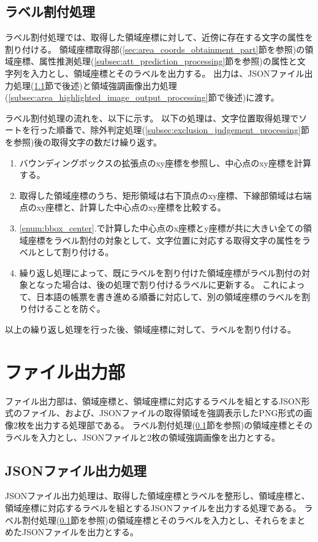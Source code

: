 \subsection{ラベル割付処理}\label{subsec:label_link_processing}
ラベル割付処理では、取得した領域座標に対して、近傍に存在する文字の属性を割り付ける。
領域座標取得部(\ref{sec:area_coords_obtainment_part}節を参照)の領域座標、属性推測処理(\ref{subsec:att_prediction_processing}節を参照)の属性と文字列を入力とし、領域座標とそのラベルを出力する。
出力は、JSONファイル出力処理(\ref{subsec:json_file_output_processing}節で後述)と領域強調画像出力処理(\ref{subsec:area_highlighted_image_output_processing}節で後述)に渡す。

ラベル割付処理の流れを、以下に示す。
以下の処理は、文字位置取得処理でソートを行った順番で、除外判定処理(\ref{subsec:exclusion_judgement_processing}節を参照)後の取得文字の数だけ繰り返す。

\begin{enumerate}
    \item \label{enum:bbox_center} バウンディングボックスの拡張点のxy座標を参照し、中心点のxy座標を計算する。
    \item 取得した領域座標のうち、矩形領域は右下頂点のxy座標、下線部領域は右端点のxy座標と、計算した中心点のxy座標を比較する。
    \item \ref{enum:bbox_center}.で計算した中心点のx座標とy座標が共に大きい全ての領域座標をラベル割付の対象として、文字位置に対応する取得文字の属性をラベルとして割り付ける。
    \item 繰り返し処理によって、既にラベルを割り付けた領域座標がラベル割付の対象となった場合は、後の処理で割り付けるラベルに更新する。
          これによって、日本語の帳票を書き進める順番に対応して、別の領域座標のラベルを割り付けることを防ぐ。
\end{enumerate}

以上の繰り返し処理を行った後、領域座標に対して、ラベルを割り付ける。

\section{ファイル出力部}\label{subsec:file_output_part}
ファイル出力部は、領域座標と、領域座標に対応するラベルを組とするJSON形式のファイル、および、JSONファイルの取得領域を強調表示したPNG形式の画像2枚を出力する処理部である。
ラベル割付処理(\ref{subsec:label_link_processing}節を参照)の領域座標とそのラベルを入力とし、JSONファイルと2枚の領域強調画像を出力とする。

\subsection{JSONファイル出力処理}\label{subsec:json_file_output_processing}
JSONファイル出力処理は、取得した領域座標とラベルを整形し、領域座標と、領域座標に対応するラベルを組とするJSONファイルを出力する処理である。
ラベル割付処理(\ref{subsec:label_link_processing}節を参照)の領域座標とそのラベルを入力とし、それらをまとめたJSONファイルを出力とする。

